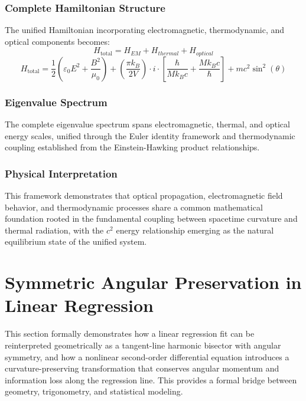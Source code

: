﻿\documentclass[12pt]{article}
\begin{document}
\subsubsection{Complete Hamiltonian Structure}
The unified Hamiltonian incorporating electromagnetic, thermodynamic, and optical components becomes:
$$H_{\text{total}} = H_{EM} + H_{thermal} + H_{optical}$$
$$H_{\text{total}} = \frac{1}{2}\left(\varepsilon_0 E^2 + \frac{B^2}{\mu_0}\right) + \left(\frac{\pi k_B}{2V}\right)\cdot i\cdot\left[\frac{\hbar}{Mk_Bc} + \frac{Mk_Bc}{\hbar}\right] + mc^2\sin^2(\theta)$$

\subsubsection{Eigenvalue Spectrum}
The complete eigenvalue spectrum spans electromagnetic, thermal, and optical energy scales, unified through the Euler identity framework and thermodynamic coupling established from the Einstein-Hawking product relationships.

\subsubsection{Physical Interpretation}
This framework demonstrates that optical propagation, electromagnetic field behavior, and thermodynamic processes share a common mathematical foundation rooted in the fundamental coupling between spacetime curvature and thermal radiation, with the $c^2$ energy relationship emerging as the natural equilibrium state of the unified system.

\section{Symmetric Angular Preservation in Linear Regression}
This section formally demonstrates how a linear regression fit can be reinterpreted geometrically as a tangent-line harmonic bisector with angular symmetry, and how a nonlinear second-order differential equation introduces a curvature-preserving transformation that conserves angular momentum and information loss along the regression line. This provides a formal bridge between geometry, trigonometry, and statistical modeling.
\end{document}
